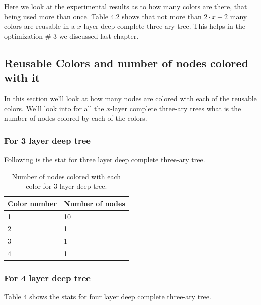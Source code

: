 \documentclass{article}
\theoremstyle{remark}
\begin{document}
Here we look at the experimental results as to how many colors are there, that being used more than once. Table 4.2 shows that not more than $2\cdot x + 2$ many colors are reusable in a $x$ layer deep complete three-ary tree. This helps in the optimization \# 3 we discussed last chapter.

\subsection{Reusable Colors and number of nodes colored with it}
In this section we'll look at how many nodes are colored with each of the reusable colors. We'll look into for all the $x$-layer complete three-ary trees what is the number of nodes colored by each of the colors.

\subsubsection{For 3 layer deep tree}
Following is the stat for three layer deep complete three-ary tree.

\begin{table}[h]
    \centering
    \begin{tabular}{|l|l|}
        \hline
        \textbf{Color number} & \textbf{Number of nodes} \\ \hline
        1                     & 10                                           \\ \hline
        2                     & 1                                            \\ \hline
        3                     & 1                                            \\ \hline
        4                     & 1                                            \\ \hline
    \end{tabular}
    \caption{Number of nodes colored with each color for 3 layer deep tree.}
    \label{tab:colors}
\end{table}

\subsubsection{For 4 layer deep tree}
Table $4$ shows the stats for four layer deep complete three-ary tree.
\end{document}
